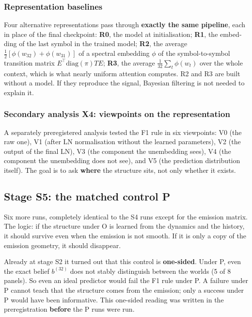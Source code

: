 \documentclass[12pt,a4paper]{article}
\newcommand{\en}[1]{\foreignlanguage{english}{#1}}   %
\newcommand{\bel}[1]{b^{(#1)}}
\begin{document}
\subsubsection{Representation baselines}
Four alternative representations pass through \textbf{exactly the same pipeline}, each in place of the final checkpoint: \textbf{R0}, the model at initialisation; \textbf{R1}, the \en{embedding} of the last symbol in the trained model; \textbf{R2}, the average $\tfrac12[\phi(w_{32})+\phi(w_{31})]$ of a spectral \en{embedding} $\phi$ of the symbol-to-symbol transition matrix $E^{\top}\mathrm{diag}(\pi)TE$; \textbf{R3}, the average $\tfrac1{32}\sum_t\phi(w_t)$ over the whole context, which is what nearly uniform \en{attention} computes. R2 and R3 are built without a model. If they reproduce the signal, Bayesian filtering is not needed to explain it.

\subsubsection{Secondary analysis \en{X4}: viewpoints on the representation}
A separately preregistered analysis tested the F1 rule in six viewpoints: V0 (the raw one), V1 (after \en{LN} normalisation without the learned parameters), V2 (the output of the final \en{LN}), V3 (the component the \en{unembedding} sees), V4 (the component the \en{unembedding} does not see), and V5 (the prediction distribution itself). The goal is to ask \textbf{where} the structure sits, not only whether it exists.

\subsection{Stage S5: the matched control P}
Six more runs, completely identical to the S4 runs except for the emission matrix. The logic: if the structure under O is learned from the dynamics and the history, it should survive even when the emission is not smooth. If it is only a copy of the emission geometry, it should disappear.

Already at stage S2 it turned out that this control is \textbf{one-sided}. Under P, even the exact belief $\bel{32}$ does not stably distinguish between the worlds (5 of 8 panels). So even an ideal predictor would fail the F1 rule under P. A failure under P cannot teach that the structure comes from the emission; only a success under P would have been informative. This one-sided reading was written in the preregistration \textbf{before} the P runs were run.
\end{document}
